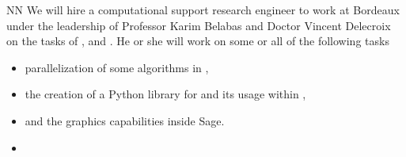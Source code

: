 \begin{participant}[type=R, PM=48]{NN}
We will hire a computational support research engineer to work at Bordeaux
 under the leadership of Professor Karim Belabas and Doctor Vincent
Delecroix on the tasks of ,  and .
He or she will work on some or all of the following tasks
\begin{itemize}
\item parallelization of some algorithms in \PariGP,
\item the creation of a Python library for \PariGP and its usage within \Sage,
\item and the graphics capabilities inside Sage.
\item {}
\end{itemize}
\end{participant}
